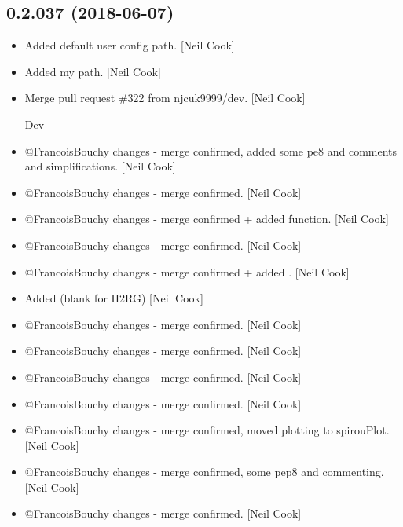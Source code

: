 \documentclass[a4paper,10pt,english]{report}
\begin{document}
\subsection{0.2.037 (2018-06-07)}
\label{\detokenize{misc/changelog:id426}}\begin{itemize}
\item {} 
Added default user config path. {[}Neil Cook{]}

\item {} 
Added my path. {[}Neil Cook{]}

\item {} 
Merge pull request \#322 from njcuk9999/dev. {[}Neil Cook{]}

Dev

\item {} 
@FrancoisBouchy changes - merge confirmed, added some pe8 and comments
and simplifications. {[}Neil Cook{]}

\item {} 
@FrancoisBouchy changes - merge confirmed. {[}Neil Cook{]}

\item {} 
@FrancoisBouchy changes - merge confirmed + added 
function. {[}Neil Cook{]}

\item {} 
@FrancoisBouchy changes - merge confirmed. {[}Neil Cook{]}

\item {} 
@FrancoisBouchy changes - merge confirmed + added
. {[}Neil Cook{]}

\item {} 
Added  (blank for H2RG) {[}Neil Cook{]}

\item {} 
@FrancoisBouchy changes - merge confirmed. {[}Neil Cook{]}

\item {} 
@FrancoisBouchy changes - merge confirmed. {[}Neil Cook{]}

\item {} 
@FrancoisBouchy changes - merge confirmed. {[}Neil Cook{]}

\item {} 
@FrancoisBouchy changes - merge confirmed. {[}Neil Cook{]}

\item {} 
@FrancoisBouchy changes - merge confirmed, moved plotting to
spirouPlot. {[}Neil Cook{]}

\item {} 
@FrancoisBouchy changes - merge confirmed, some pep8 and commenting.
{[}Neil Cook{]}

\item {} 
@FrancoisBouchy changes - merge confirmed. {[}Neil Cook{]}

\end{itemize}
\end{document}
